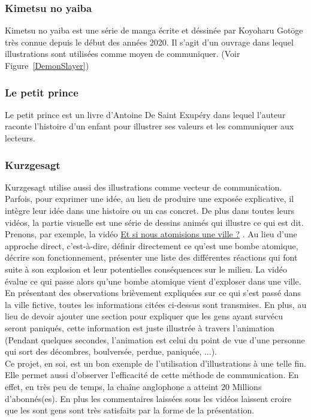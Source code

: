 \subsubsection{Kimetsu no yaiba}
Kimetsu no yaiba est une s\'erie de manga \'ecrite et d\'essin\'ee par Koyoharu Got\=oge tr\`es connue depuis le d\'ebut des ann\'ees 2020. Il s'agit d'un ouvrage dans lequel illustrations sont utilis\'ees comme moyen de communiquer. (Voir Figure~\ref{DemonSlayer})

\subsubsection{Le petit prince\cite{LePetitPrince}}
Le petit prince est un livre d'Antoine De Saint Exup\'ery dans lequel l'auteur raconte l'histoire d'un enfant pour illustrer ses valeurs et les communiquer aux lecteurs.


\subsubsection{Kurzgesagt}
Kurzgesagt utilise aussi des illustrations comme vecteur de communication. Parfois, pour exprimer une id\'ee, au lieu de produire une expos\'ee explicative, il int\`egre leur id\'ee dans une histoire ou un cas concret. De plus dans toutes leurs vid\'eos, la partie visuelle est une s\'erie de dessins anim\'es qui illustre ce qui est dit. Prenons, par exemple, la vid\'eo \href{https://www.kurzgesagt.org/}{Et si nous atomisions une ville ?}%
. Au lieu d'une approche direct, c'est-\`a-dire, d\'efinir directement ce qu'est une bombe atomique, d\'ecrire son fonctionnement, pr\'esenter une liste des diff\'erentes r\'eactions qui font suite \`a son explosion et leur potentielles cons\'equences sur le milieu. La vid\'eo \'evalue ce qui passe alors qu'une bombe atomique vient d'exploser dans une ville. En pr\'esentant des observations bri\`evement expliqu\'ees sur ce qui s'est pass\'e dans la ville fictive, toutes les informations cit\'ees ci-dessus sont transmises. En plus, au lieu de devoir ajouter une section pour expliquer que les gens ayant surv\'ecu seront paniqu\'es, cette information est juste illustr\'ee \`a travers l'animation (Pendant quelques secondes, l'animation est celui du point de vue d'une personne qui sort des d\'ecombres, boulvers\'ee, perdue, paniqu\'ee, ...).\\
Ce projet, en soi, est un bon exemple de l'utilisation d'illustrations \`a une telle fin. Elle permet aussi d'observer l'efficacit\'e de cette m\'ethode de communication. En effet, en tr\`es peu de temps, la cha\^ine anglophone a atteint 20 Millions d'abonn\'es(es). En plus les commentaires laiss\'ees sous les vid\'eos laissent croire que les sont gens sont tr\`es satisfaits par la forme de la pr\'esentation.




